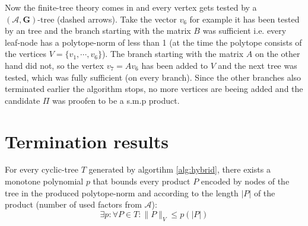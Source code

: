 Now the finite-tree theory comes in and every vertex gets tested by a $(\mathcal{A},\mathbf{G})\text{-tree}$ (dashed arrows). Take the vector $v_6$ for example it has been tested by an tree and the branch starting with the matrix $B$ was sufficient i.e. every leaf-node has a polytope-norm of less than 1 (at the time the polytope consists of the vertices $V = \{v_1, \cdots, v_6\}$). The branch starting with the matrix $A$ on the other hand did not, so the vertex $v_7 = Av_6$ has been added to $V$ and the next tree was tested, which was fully sufficient (on every branch). Since the other branches also terminated earlier the algorithm stops, no more vertices are beeing added and the candidate $\Pi$ was proofen to be a s.m.p product. 

\section{Termination results}

\begin{lemma}
  \label{lem:poly}
  For every cyclic-tree $T$ generated by algortihm \ref{alg:hybrid}, there exists a monotone polynomial $p$ that bounds every product $P$ encoded by nodes of the tree in the produced polytope-norm and according to the length $\lvert P \rvert$ of the product (number of used factors from $\mathcal{A}$): 
  $$
    \exists p: \forall P \in T: \lVert P \rVert _{V} \le p(\lvert P \rvert)
  $$
\end{lemma}

